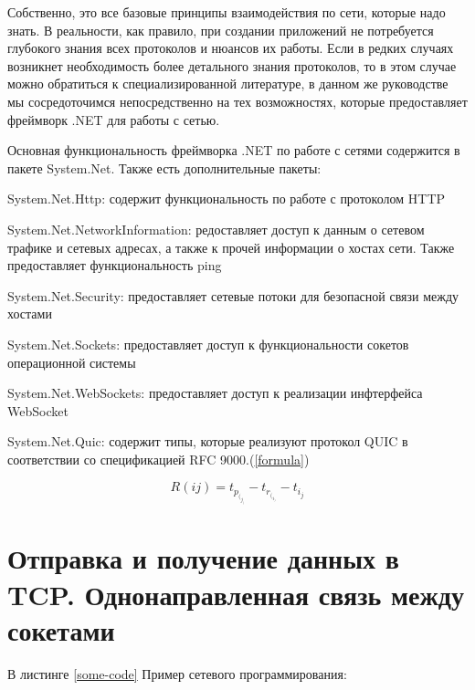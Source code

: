 \documentclass[a4paper, 12pt]{report}
\begin{document}
	Собственно, это все базовые принципы взаимодействия по сети, которые надо знать. В реальности, как правило, при создании приложений не потребуется глубокого знания всех протоколов и нюансов их работы. Если в редких случаях возникнет необходимость более детального знания протоколов, то в этом случае можно обратиться к специализированной литературе, в данном же руководстве мы сосредоточимся непосредственно на тех возможностях, которые предоставляет фреймворк .NET для работы с сетью.
	
	Основная функциональность фреймворка .NET по работе с сетями содержится в пакете System.Net. Также есть дополнительные пакеты:
	
	System.Net.Http: содержит функциональность по работе с протоколом HTTP
	
	System.Net.NetworkInformation: редоставляет доступ к данным о сетевом трафике и сетевых адресах, а также к прочей информации о хостах сети. Также предоставляет функциональность ping
	
	System.Net.Security: предоставляет сетевые потоки для безопасной связи между хостами
	
	System.Net.Sockets: предоставляет доступ к функциональности сокетов операционной системы
	
	System.Net.WebSockets: предоставляет доступ к реализации инфтерфейса WebSocket
	
	System.Net.Quic: содержит типы, которые реализуют протокол QUIC в соответствии со спецификацией RFC 9000.(\ref{formula})

	\begin{equation}
		R(ij)= t_p_(_j_)- t_r_(_i_)-t_i_j
		\label{formula}
	\end{equation}
	
	\chapter{Отправка и получение данных в TCP. Однонаправленная связь между сокетами}
	
	В листинге \ref{some-code} Пример сетевого программирования:
	
\end{document}
